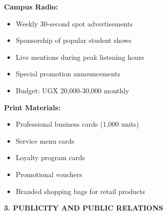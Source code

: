 \documentclass[a4paper,12pt]{article}
\begin{document}
\textbf{Campus Radio:}
\begin{itemize}[leftmargin=2em]
    \item Weekly 30-second spot advertisements
    \item Sponsorship of popular student shows
    \item Live mentions during peak listening hours
    \item Special promotion announcements
    \item Budget: UGX 20,000-30,000 monthly
\end{itemize}

\textbf{Print Materials:}
\begin{itemize}[leftmargin=2em]
    \item Professional business cards (1,000 units)
    \item Service menu cards
    \item Loyalty program cards
    \item Promotional vouchers
    \item Branded shopping bags for retail products
\end{itemize}

\vspace{1em}

\textbf{3. PUBLICITY AND PUBLIC RELATIONS}
\end{document}
